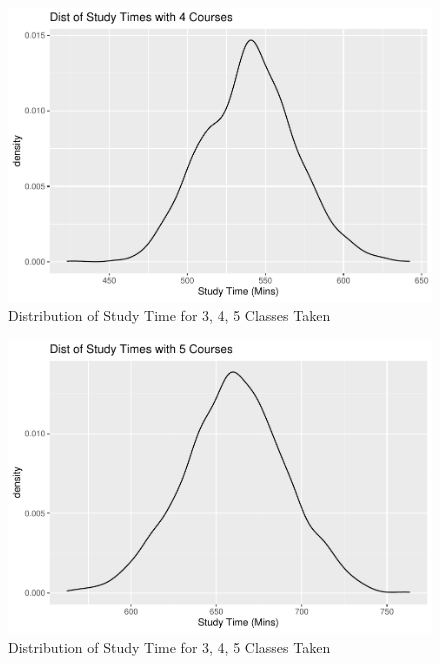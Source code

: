 \documentclass[
]{book}
\newenvironment{Shaded}{\begin{snugshade}}{\end{snugshade}}
\newcommand{\AttributeTok}[1]{\textcolor[rgb]{0.13,0.29,0.53}{#1}}
\newcommand{\DecValTok}[1]{\textcolor[rgb]{0.00,0.00,0.81}{#1}}
\newcommand{\DocumentationTok}[1]{\textcolor[rgb]{0.56,0.35,0.01}{\textbf{\textit{#1}}}}
\newcommand{\FloatTok}[1]{\textcolor[rgb]{0.00,0.00,0.81}{#1}}
\newcommand{\FunctionTok}[1]{\textcolor[rgb]{0.13,0.29,0.53}{\textbf{#1}}}
\newcommand{\NormalTok}[1]{#1}
\newcommand{\OtherTok}[1]{\textcolor[rgb]{0.56,0.35,0.01}{#1}}
\newcommand{\SpecialCharTok}[1]{\textcolor[rgb]{0.81,0.36,0.00}{\textbf{#1}}}
\newcommand{\StringTok}[1]{\textcolor[rgb]{0.31,0.60,0.02}{#1}}
\begin{document}
\begin{figure}
\centering
\includegraphics{bookdown-demo_files/figure-latex/10-conddist4-1.pdf}
\caption{\label{fig:10-conddist4}Distribution of Study Time for 3, 4, 5 Classes Taken}
\end{figure}

\begin{Shaded}
\end{Shaded}

\begin{figure}
\centering
\includegraphics{bookdown-demo_files/figure-latex/10-conddist5-1.pdf}
\caption{\label{fig:10-conddist5}Distribution of Study Time for 3, 4, 5 Classes Taken}
\end{figure}
\end{document}
